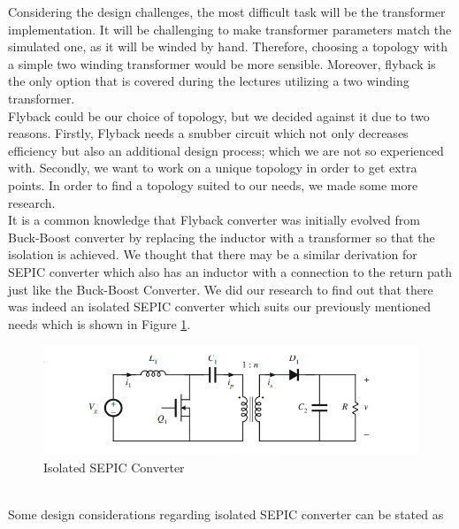 Considering the design challenges, the most difficult task will be the transformer implementation. It will be challenging to make transformer parameters match the simulated one, as it will be winded by hand. Therefore, choosing a topology with a simple two winding transformer would be more sensible. Moreover, flyback is the only option that is covered during the lectures utilizing a two winding transformer. \smallskip \\
Flyback could be our choice of topology, but we decided against it due to two reasons. Firstly, Flyback needs a snubber circuit which not only decreases efficiency but also an additional design process; which we are not so experienced with. Secondly, we want to work on a unique topology in order to get extra points. In order to find a topology suited to our needs, we made some more research. \smallskip \\
It is a common knowledge that Flyback converter was initially evolved from Buck-Boost converter by replacing the inductor with a transformer so that the isolation is achieved. We thought that there may be a similar derivation for SEPIC converter which also has an inductor with a connection to the return path just like the Buck-Boost Converter. We did our research to find out that there was indeed an isolated SEPIC converter which suits our previously mentioned needs which is shown in Figure \ref{fig:iso_sepic}.
\begin{figure}[h]
    \centering
    \includegraphics[width=\textwidth]{Figures/isolated_sepic.png}
    \caption{Isolated SEPIC Converter}
    \label{fig:iso_sepic}
\end{figure} \\
Some design considerations regarding isolated SEPIC converter can be stated as
